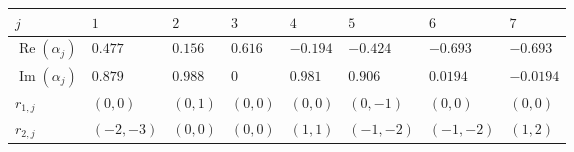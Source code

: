 \documentclass[pdftex]{sigma}
\numberwithin{equation}{section}
\def\Re{\operatorname{Re}}
\def\Im{\operatorname{Im}}
\begin{document}
\begin{center}
\def\arraystretch{1.2}
\begin{tabular}{|l|l|l|l|l|l|l|l|}\hline
$j$ & $1$ & $2$ & $3$ & $4$ & $5$ & $6$ & $7$
\\ \hline
$\Re(\alpha_j)$ & $0.477$ & $0.156$ & $0.616$ & $-0.194$ & $-0.424$ & $-0.693$ & $-0.693$
\\ \hline
$\Im(\alpha_j)$ & $0.879$ & $0.988$ & $0$ & $0.981$ & $0.906$ & $0.0194$ & $-0.0194$
\\ \hline
$r_{1,j}$ & $(0,0)$ & $(0,1)$ & $(0,0)$ & $(0,0)$ & $(0,-1)$ & $(0,0)$ & $(0,0)$ \\ \hline
$r_{2,j}$ & $(-2,-3)$ & $(0,0)$ & $(0,0)$ & $(1,1)$ & $(-1,-2)$ & $(-1,-2)$ & $(1,2)$ \\ \hline
\end{tabular}
\end{center}
\end{document}
